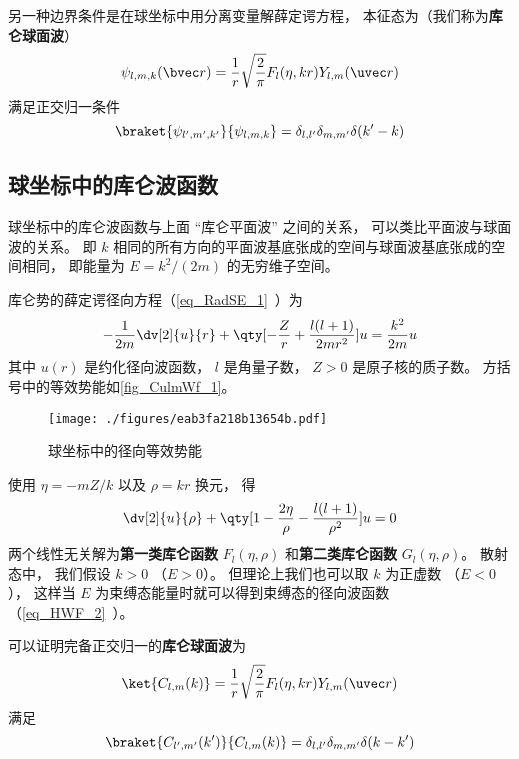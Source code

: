 另一种边界条件是在球坐标中用分离变量解薛定谔方程， 本征态为（我们称为\textbf{库仑球面波}）
\begin{equation}\label{eq_CulmWf_11}
\psi_{l,m,k}(\bvec r) = \frac{1}{r} \sqrt{\frac{2}{\pi}} F_l(\eta, kr) Y_{l,m}(\uvec r)
\end{equation}
满足正交归一条件
\begin{equation}
\braket{\psi_{l',m',k'}}{\psi_{l,m,k}} = \delta_{l,l'}\delta_{m,m'} \delta(k'-k)
\end{equation}

\subsection{球坐标中的库仑波函数}
球坐标中的库仑波函数与上面 “库仑平面波” 之间的关系， 可以类比平面波与球面波的关系。 即 $k$ 相同的所有方向的平面波基底张成的空间与球面波基底张成的空间相同， 即能量为 $E = k^2/(2m)$ 的无穷维子空间。

库仑势的薛定谔径向方程（\autoref{eq_RadSE_1}~）为
\begin{equation}\label{eq_CulmWf_5}
-\frac{1}{2m} \dv[2]{u}{r} + \qty[-\frac{Z}{r} + \frac{l(l+1)}{2mr^2}]u = \frac{k^2}{2m}u
\end{equation}
其中 $u(r)$ 是约化径向波函数， $l$ 是角量子数， $Z > 0$ 是原子核的质子数。 方括号中的等效势能如\autoref{fig_CulmWf_1}。
\begin{figure}[ht]
\centering
\texttt{[image: ./figures/eab3fa218b13654b.pdf]}
\caption{球坐标中的径向等效势能} \label{fig_CulmWf_1}
\end{figure}
使用 $\eta = -mZ/k$ 以及 $\rho = kr$ 换元， 得
\begin{equation}
\dv[2]{u}{\rho} + \qty[1 - \frac{2\eta}{\rho} - \frac{l(l+1)}{\rho^2}]u = 0
\end{equation}
两个线性无关解为\textbf{第一类库仑函数} $F_l(\eta, \rho)$ 和\textbf{第二类库仑函数} $G_l(\eta, \rho)$。 散射态中， 我们假设 $k > 0$ （$E > 0$）。 但理论上我们也可以取 $k$ 为正虚数 （$E < 0$）， 这样当 $E$ 为束缚态能量时就可以得到束缚态的径向波函数（\autoref{eq_HWF_2}~）。

可以证明完备正交归一的\textbf{库仑球面波}为
\begin{equation}\label{eq_CulmWf_1}
\ket{C_{l,m}(k)} = \frac{1}{r} \sqrt{\frac{2}{\pi}} F_l(\eta, kr) Y_{l,m}(\uvec r)
\end{equation}
满足
\begin{equation}\label{eq_CulmWf_2}
\braket{C_{l',m'}(k')}{C_{l,m}(k)} = \delta_{l,l'}\delta_{m,m'}\delta(k-k')
\end{equation}

